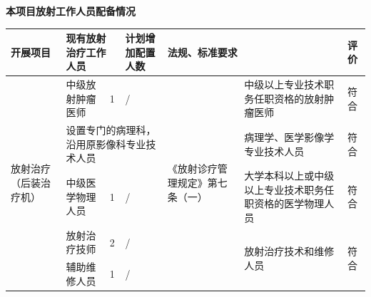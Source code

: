 \vspace{10mm}
\begin{center}
\songti
\setlength{\tabrestwidth}{\dimexpr\textwidth - 2.0cm - 12\tabcolsep - 8\arrayrulewidth\relax}
\textbf{本项目放射工作人员配备情况}\par\vspace{2mm}
\begin{tabular}{|p{2.0cm}|p{\dimexpr\tabrestwidth/6\relax}|p{\dimexpr\tabrestwidth/6\relax}|p{\dimexpr\tabrestwidth/6\relax}|p{\dimexpr\tabrestwidth/6\relax}|p{\dimexpr\tabrestwidth/6\relax}|p{\dimexpr\tabrestwidth/6\relax}|}
\hline
\raggedright 开展项目 & \multicolumn{2}{|p{\dimexpr \dimexpr\tabrestwidth/6\relax + \dimexpr\tabrestwidth/6\relax + 2\tabcolsep + 1\arrayrulewidth\relax}|}{\raggedright 现有放射治疗工作人员} & \raggedright 计划增加配置人数 & \multicolumn{2}{|p{\dimexpr \dimexpr\tabrestwidth/6\relax + \dimexpr\tabrestwidth/6\relax + 2\tabcolsep + 1\arrayrulewidth\relax}|}{\raggedright 法规、标准要求} & \raggedright 评价 \\
\hline
\multirow{5}{*}{\raggedright 放射治疗（后装治疗机）} & \raggedright 中级放射肿瘤医师 & \raggedright 1 & \raggedright / & \multirow{5}{*}{\raggedright 《放射诊疗管理规定》第七条（一）} & \raggedright 中级以上专业技术职务任职资格的放射肿瘤医师 & \raggedright 符合 \\
 & \multicolumn{3}{|p{\dimexpr \dimexpr\tabrestwidth/6\relax + \dimexpr\tabrestwidth/6\relax + \dimexpr\tabrestwidth/6\relax + 4\tabcolsep + 2\arrayrulewidth\relax}|}{\raggedright 设置专门的病理科，沿用原影像科专业技术人员} &  & \raggedright 病理学、医学影像学专业技术人员 & \raggedright 符合 \\
 & \raggedright 中级医学物理人员 & \raggedright 1 & \raggedright / &  & \raggedright 大学本科以上或中级以上专业技术职务任职资格的医学物理人员 & \raggedright 符合 \\
 & \raggedright 放射治疗技师 & \raggedright 2 & \raggedright / &  & \multirow{2}{*}{\raggedright 放射治疗技术和维修人员} & \multirow{2}{*}{\raggedright 符合} \\
 & \raggedright 辅助维修人员 & \raggedright 1 & \raggedright / &  &  &  \\
\hline
\end{tabular}
\end{center}



